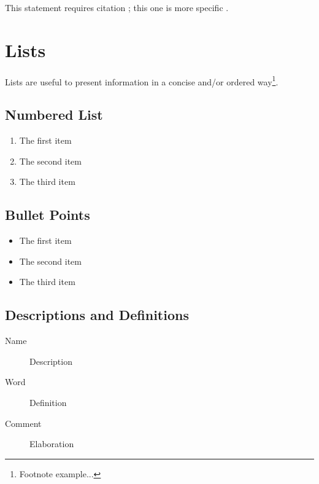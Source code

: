 \documentclass[12pt,fleqn,a4paper]{book} %
\begin{document}
        This statement requires citation \cite{book_key}; this one is more specific \cite[122]{article_key}.
    
    
    \section{Lists}
    
    Lists are useful to present information in a concise and/or ordered way\footnote{Footnote example...}.
    
    \subsection{Numbered List}
    
    \begin{enumerate}
    \item The first item
    \item The second item
    \item The third item
    \end{enumerate}
    
    \subsection{Bullet Points}
    
    \begin{itemize}
    \item The first item
    \item The second item
    \item The third item
    \end{itemize}
    
    \subsection{Descriptions and Definitions}
    
    \begin{description}
    \item[Name] Description
    \item[Word] Definition
    \item[Comment] Elaboration
    \end{description}
    
    
\end{document}
